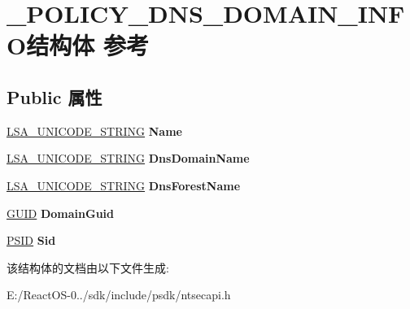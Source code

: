 \hypertarget{struct___p_o_l_i_c_y___d_n_s___d_o_m_a_i_n___i_n_f_o}{}\section{\+\_\+\+P\+O\+L\+I\+C\+Y\+\_\+\+D\+N\+S\+\_\+\+D\+O\+M\+A\+I\+N\+\_\+\+I\+N\+F\+O结构体 参考}
\label{struct___p_o_l_i_c_y___d_n_s___d_o_m_a_i_n___i_n_f_o}
\subsection*{Public 属性}
\begin{DoxyCompactItemize}
\item 
\mbox{\label{struct___p_o_l_i_c_y___d_n_s___d_o_m_a_i_n___i_n_f_o_a9990804491b088474332a87e391bd206}} 
\hyperlink{struct___l_s_a___u_n_i_c_o_d_e___s_t_r_i_n_g}{L\+S\+A\+\_\+\+U\+N\+I\+C\+O\+D\+E\+\_\+\+S\+T\+R\+I\+NG} {\bfseries Name}
\item 
\mbox{\label{struct___p_o_l_i_c_y___d_n_s___d_o_m_a_i_n___i_n_f_o_ad25803c9a123198384f0e22d8f760eb0}} 
\hyperlink{struct___l_s_a___u_n_i_c_o_d_e___s_t_r_i_n_g}{L\+S\+A\+\_\+\+U\+N\+I\+C\+O\+D\+E\+\_\+\+S\+T\+R\+I\+NG} {\bfseries Dns\+Domain\+Name}
\item 
\mbox{\label{struct___p_o_l_i_c_y___d_n_s___d_o_m_a_i_n___i_n_f_o_aef237f8867944cb7eefb64a84e498820}} 
\hyperlink{struct___l_s_a___u_n_i_c_o_d_e___s_t_r_i_n_g}{L\+S\+A\+\_\+\+U\+N\+I\+C\+O\+D\+E\+\_\+\+S\+T\+R\+I\+NG} {\bfseries Dns\+Forest\+Name}
\item 
\mbox{\label{struct___p_o_l_i_c_y___d_n_s___d_o_m_a_i_n___i_n_f_o_aabdbac134f087a2b62953ad8998097d0}} 
\hyperlink{interface_g_u_i_d}{G\+U\+ID} {\bfseries Domain\+Guid}
\item 
\mbox{\label{struct___p_o_l_i_c_y___d_n_s___d_o_m_a_i_n___i_n_f_o_a46df0f62071f827602bb739dc5a3eb94}} 
\hyperlink{struct___s_i_d}{P\+S\+ID} {\bfseries Sid}
\end{DoxyCompactItemize}


该结构体的文档由以下文件生成\+:\begin{DoxyCompactItemize}
\item 
E\+:/\+React\+O\+S-\/0../sdk/include/psdk/ntsecapi.\+h\end{DoxyCompactItemize}
